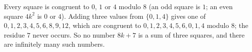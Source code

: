 Every square is congruent to $0$, $1$ or $4$ modulo $8$ (an odd square is $1$; an even square $4k^2$ is $0$ or $4$). Adding three values from $\{0,1,4\}$ gives one of $0,1,2,3,4,5,6,8,9,12$, which are congruent to $0,1,2,3,4,5,6,0,1,4$ modulo $8$; the residue $7$ never occurs. So no number $8k+7$ is a sum of three squares, and there are infinitely many such numbers.
